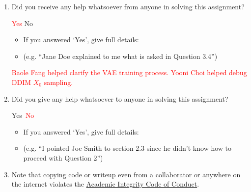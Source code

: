 \documentclass[11pt,addpoints,answers]{exam}
\numberwithin{equation}{section} %
\numberwithin{figure}{section} %
\numberwithin{table}{section} %
\begin{document}
\begin{enumerate}
    \item Did you receive any help whatsoever from anyone in solving this assignment?
    \begin{checkboxes}
     \choice \textcolor{red}{Yes}
     \choice No
    \end{checkboxes}
    \begin{itemize}
        \item If you answered `Yes', give full details:
        \item (e.g. “Jane Doe explained to me what is asked in Question 3.4”)
    \end{itemize}

    \begin{tcolorbox}[fit,height=3cm,blank, borderline={1pt}{-2pt},nobeforeafter]
    \textcolor{red}{Baole Fang helped clarify the VAE training process. Yooni Choi helped debug DDIM $X_0$ sampling.}
    \end{tcolorbox}

    \item Did you give any help whatsoever to anyone in solving this assignment?
    \begin{checkboxes}
     \choice Yes\
     \choice \textcolor{red}{No}
    \end{checkboxes}
    \begin{itemize}
        \item If you answered `Yes', give full details:
        \item (e.g. “I pointed Joe Smith to section 2.3 since he didn’t know how to proceed with Question 2”)
    \end{itemize}

    \begin{tcolorbox}[fit,height=3cm,blank, borderline={1pt}{-2pt},nobeforeafter]
    
    \end{tcolorbox}

    \item Note that copying code or writeup even from a collaborator or anywhere on the internet violates the \href{hhttps://www.cmu.edu/policies/student-and-student-life/academic-integrity.html}{Academic Integrity Code of Conduct}.
\end{enumerate}
\end{document}
